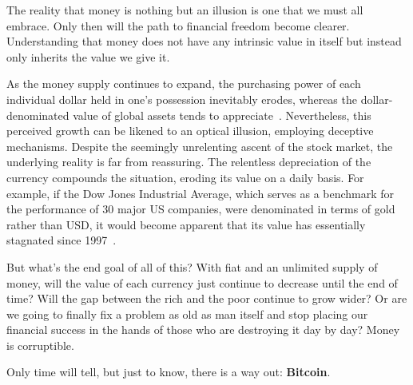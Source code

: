 The reality that money is nothing but an illusion is one that we must all embrace. Only then will the path to financial freedom become
clearer. Understanding that money does not have any intrinsic value in itself but instead only inherits the value we give it.

As the money supply continues to expand, the purchasing power of each individual dollar held in one's possession inevitably erodes, whereas the
dollar-denominated value of global assets tends to appreciate~\cite{moneyprinting}. Nevertheless, this perceived growth can be likened to an
optical illusion, employing deceptive mechanisms. Despite the seemingly unrelenting ascent of the stock market, the underlying reality is far
from reassuring. The relentless depreciation of the currency compounds the situation, eroding its value on a daily basis. For example, if the
Dow Jones Industrial Average, which serves as a benchmark for the performance of 30 major US companies, were denominated in terms of gold rather
than USD, it would become apparent that its value has essentially stagnated since 1997~\cite{stockmarketillusion}.

But what's the end goal of all of this? With fiat and an unlimited supply of money, will the value of each currency just continue to decrease
until the end of time? Will the gap between the rich and the poor continue to grow wider? Or are we going to finally fix a problem as old as
man itself and stop placing our financial success in the hands of those who are destroying it day by day? Money is corruptible.

Only time will tell, but just to know, there is a way out: \textbf{Bitcoin}.
